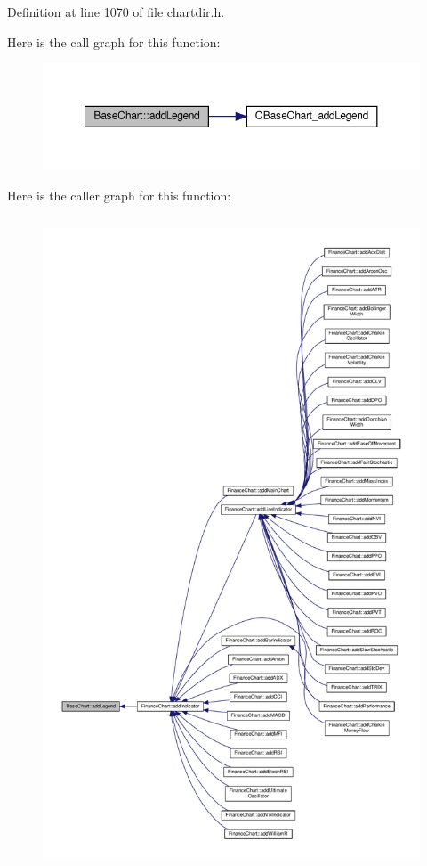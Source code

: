 Definition at line 1070 of file chartdir.\+h.

Here is the call graph for this function\+:
\nopagebreak
\begin{figure}[H]
\begin{center}
\leavevmode
\includegraphics[width=350pt]{class_base_chart_ad204c676b75a5e1527dcd01066c1aab4_cgraph}
\end{center}
\end{figure}
Here is the caller graph for this function\+:
\nopagebreak
\begin{figure}[H]
\begin{center}
\leavevmode
\includegraphics[height=550pt]{class_base_chart_ad204c676b75a5e1527dcd01066c1aab4_icgraph}
\end{center}
\end{figure}
\mbox{\label{class_base_chart_a2f48c68e5336176aae4922db13b12f9b}} 
